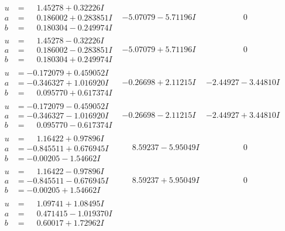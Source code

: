 \documentclass[1p]{elsarticle_modified}
\theoremstyle{definition}
\begin{document}
$$\begin{array}{c|c|c}
\begin{aligned}
u &= \phantom{-}1.45278 + 0.32226 I \\
a &= \phantom{-}0.186002 + 0.283851 I \\
b &= \phantom{-}0.180304 - 0.249974 I\end{aligned}
 & -5.07079 - 5.71196 I & \phantom{-0.000000 } 0 \\ \hline\begin{aligned}
u &= \phantom{-}1.45278 - 0.32226 I \\
a &= \phantom{-}0.186002 - 0.283851 I \\
b &= \phantom{-}0.180304 + 0.249974 I\end{aligned}
 & -5.07079 + 5.71196 I & \phantom{-0.000000 } 0 \\ \hline\begin{aligned}
u &= -0.172079 + 0.459052 I \\
a &= -0.346327 + 1.016920 I \\
b &= \phantom{-}0.095770 + 0.617374 I\end{aligned}
 & -0.26698 + 2.11215 I & -2.44927 - 3.44810 I \\ \hline\begin{aligned}
u &= -0.172079 - 0.459052 I \\
a &= -0.346327 - 1.016920 I \\
b &= \phantom{-}0.095770 - 0.617374 I\end{aligned}
 & -0.26698 - 2.11215 I & -2.44927 + 3.44810 I \\ \hline\begin{aligned}
u &= \phantom{-}1.16422 + 0.97896 I \\
a &= -0.845511 + 0.676945 I \\
b &= -0.00205 - 1.54662 I\end{aligned}
 & \phantom{-}8.59237 - 5.95049 I & \phantom{-0.000000 } 0 \\ \hline\begin{aligned}
u &= \phantom{-}1.16422 - 0.97896 I \\
a &= -0.845511 - 0.676945 I \\
b &= -0.00205 + 1.54662 I\end{aligned}
 & \phantom{-}8.59237 + 5.95049 I & \phantom{-0.000000 } 0 \\ \hline\begin{aligned}
u &= \phantom{-}1.09741 + 1.08495 I \\
a &= \phantom{-}0.471415 - 1.019370 I \\
b &= \phantom{-}0.60017 + 1.72962 I\end{aligned}

\end{array}$$
\end{document}
